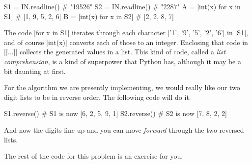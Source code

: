 \begin{pythoncode}
  S1 = IN.readline()            # "19526"
  S2 = IN.readline()            # "2287"
  A = [int(x) for x in S1]      # [1, 9, 5, 2, 6]
  B = [int(x) for x in S2]      # [2, 2, 8, 7]
\end{pythoncode}

The code \pycode|for x in S1| iterates through each character \pycode|'1', '9', '5', '2',
'6'| in \pycode|S1|, and of course \pycode|int(x)| converts each of those to an integer.
Enclosing that code in \pycode|[...]| collects the generated values in a list. This kind
of code, called a \emph{list comprehension}, is a kind of superpower that Python has,
although it may be a bit daunting at first.

For the algorithm we are presently implementing, we would really like our two digit lists
to be in reverse order. The following code will do it.

\begin{pythoncode} 
  S1.reverse()                  # S1 is now [6, 2, 5, 9, 1]
  S2.reverse()                  # S2 is now [7, 8, 2, 2]
\end{pythoncode}

And now the digits line up and you can move \emph{forward} through the two reversed lists.

\Solution The rest of the code for this problem is an exercise for you.

